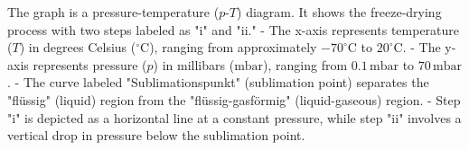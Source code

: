 The graph is a pressure-temperature (\( p \)-\( T \)) diagram. It shows the freeze-drying process with two steps labeled as "i" and "ii."  
- The x-axis represents temperature (\( T \)) in degrees Celsius (\( ^\circ \text{C} \)), ranging from approximately \(-70^\circ \text{C}\) to \( 20^\circ \text{C}\).  
- The y-axis represents pressure (\( p \)) in millibars (\( \text{mbar} \)), ranging from \( 0.1 \, \text{mbar} \) to \( 70 \, \text{mbar} \).  
- The curve labeled "Sublimationspunkt" (sublimation point) separates the "flüssig" (liquid) region from the "flüssig-gasförmig" (liquid-gaseous) region.  
- Step "i" is depicted as a horizontal line at a constant pressure, while step "ii" involves a vertical drop in pressure below the sublimation point.